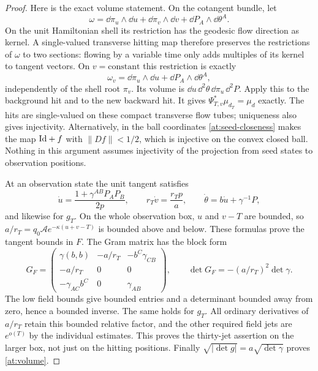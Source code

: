\begin{proof}
Here is the exact volume statement. On the cotangent bundle,
let
\[
 \omega=\dd\pi_u\wedge\dd u+\dd\pi_v\wedge\dd v
                              +\dd P_A\wedge\dd\theta^A.
\]
On the unit Hamiltonian shell its restriction has the geodesic
flow direction as kernel. A single-valued transverse hitting
map therefore preserves the restrictions of $\omega$ to two
sections: flowing by a variable time only adds multiples of its
kernel to tangent vectors. On $v=\mathrm{constant}$ this
restriction is exactly
\[
 \omega_v=\dd\pi_u\wedge\dd u+\dd P_A\wedge\dd\theta^A,
\]
independently of the shell root $\pi_v$. Its volume is
$\dd u\,\dd^2\theta\,\dd\pi_u\,\dd^2P$.
Apply this to the background hit and to the new backward hit.
It gives $\Psi_{T,v}^*\mu_{d_T}=\mu_d$ exactly.
The hits are single-valued on these compact transverse flow
tubes; uniqueness also gives injectivity. Alternatively, in
the ball coordinates \eqref{at:seed-closeness} makes the map
$\mathrm{Id}+f$ with $\|Df\|<1/2$, which is injective on the convex
closed ball. Nothing in this argument assumes injectivity of
the projection from seed states to observation positions.

At an observation state the unit tangent satisfies
\begin{equation}\label{at:tangent-components}
 \dot u=\frac{1+\gamma^{AB}P_AP_B}{2p},\qquad
 r_T\dot v=\frac{r_Tp}{a},\qquad
 \dot\theta=b\dot u+\gamma^{-1}P,
\end{equation}
and likewise for $g_T$. On the whole observation box, $u$ and
$v-T$ are bounded, so
$a/r_T=q_0\mathcal A e^{-\kappa(u+v-T)}$ is bounded above
and below. These formulas prove the tangent bounds in $F$.
The Gram matrix has the block form
\begin{equation}\label{at:gram}
 G_F=\begin{pmatrix}
       \gamma(b,b)&-a/r_T&-b^C\gamma_{CB}\\
       -a/r_T&0&0\\
       -\gamma_{AC}b^C&0&\gamma_{AB}
      \end{pmatrix},\qquad
 \det G_F=-(a/r_T)^2\det\gamma.
\end{equation}
The low field bounds give bounded entries and a determinant
bounded away from zero, hence a bounded inverse. The same
holds for $g_T$. All ordinary derivatives of $a/r_T$ retain
this bounded relative factor, and the other required field
jets are $e^{o(T)}$ by the individual estimates. This proves
the thirty-jet assertion on the larger box, not just on the
hitting positions. Finally
$\sqrt{|\det g|}=a\sqrt{\det\gamma}$ proves
\eqref{at:volume}.


\end{proof}
